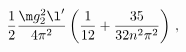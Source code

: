 \begin{equation}
\frac{1}{2}\frac{\m g_2^2\l'}{4\pi^2}\left(\frac{1}{12}+\frac{35}{32n^2\pi^2}\right)\,,
\end{equation}

